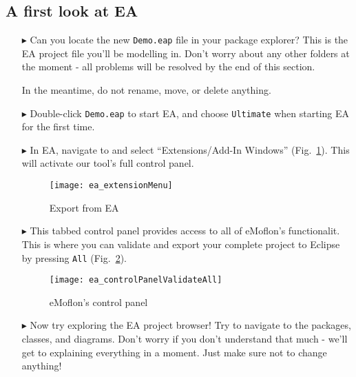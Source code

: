 \clearpage
\visHeader

\subsection{A first look at EA}

\begin{itemize}
\FloatBarrier
\hypertarget{simpleDemo vis}{}
\item[$\blacktriangleright$] Can you locate the new \texttt{Demo.eap} file in your package explorer? This is the EA project file you'll be
modelling in. Don't worry about any other folders at the moment - all problems will be resolved by the end of this section.

In the meantime, do not rename, move, or delete anything.

\item[$\blacktriangleright$] Double-click \texttt{Demo.eap} to start EA, and choose \texttt{Ultimate} when starting EA for the first time.

\item[$\blacktriangleright$] In EA, navigate to and select ``Extensions/Add-In Windows'' (Fig.~\ref{ea:validate_dropdown}). This will activate our tool's full
control panel.

\vspace{0.5cm}

\begin{figure}[htbp]
	\centering
  \texttt{[image: ea\_extensionMenu]}
	\caption{Export from EA} 
	\label{ea:validate_dropdown} 
\end{figure}

\item[$\blacktriangleright$] This tabbed control panel provides access to all of eMoflon's functionalit. This is where you can validate and export your complete
project to Eclipse by pressing \texttt{All} (Fig.~\ref{ea:controlPanel}).

\begin{figure}[htbp]
	\centering
  \texttt{[image: ea\_controlPanelValidateAll]}
	\caption{eMoflon's control panel} 
	\label{ea:controlPanel} 
\end{figure}

\item[$\blacktriangleright$] Now try exploring the EA project browser! Try to navigate to the packages, classes, and diagrams. Don't worry if you don't
understand that much - we'll get to explaining everything in a moment. Just make sure not to change anything!


\end{itemize}
